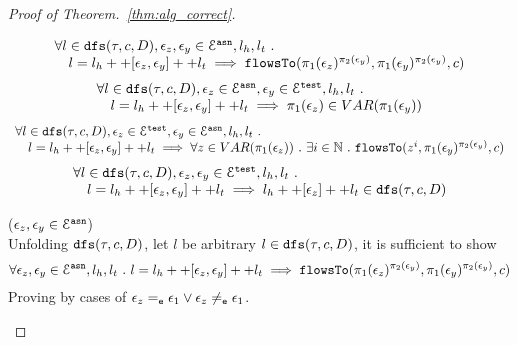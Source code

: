 \documentclass[a4paper,11pt]{article}
\begin{document}
\begin{proof}[Proof of Theorem.~\ref{thm:alg_correct}]
\begin{case}
\begin{equation}
\begin{array}{l}
   \forall l \in \mathtt{dfs}(\mathtt{\tau}, c, D), \mathtt{\epsilon}_z, \mathtt{\epsilon}_y \in \mathcal{E}^{\mathtt{{asn}}}, l_h, l_t ~.~ 
   \\ \quad 
   l = l_h ++ [\mathtt{\epsilon}_z, \mathtt{\epsilon}_y] ++ l_t 
   \implies \mathtt{flowsTo}(\pi_1(\mathtt{\epsilon}_z)^{\pi_2(\mathtt{\epsilon}_y)}, \pi_1(\mathtt{\epsilon}_y)^{\pi_2(\mathtt{\epsilon}_y)}, c)
\end{array}
\end{equation}
%
\begin{equation}
\begin{array}{l}
  \forall l \in \mathtt{dfs}(\mathtt{\tau}, c, D), \mathtt{\epsilon}_z \in \mathcal{E}^{\mathtt{{asn}}}, \mathtt{\epsilon}_y \in \mathcal{E}^{\mathtt{{test}}}, l_h, l_t ~.~
   \\ \quad 
   l = l_h ++ [\mathtt{\epsilon}_z, \mathtt{\epsilon}_y] ++ l_t 
  \implies \pi_1(\mathtt{\epsilon}_z) \in VAR(\pi_1(\mathtt{\epsilon}_y))
\end{array}
\end{equation}
%
\begin{equation}
\begin{array}{l}
  \forall l \in \mathtt{dfs}(\mathtt{\tau}, c, D), \mathtt{\epsilon}_z \in \mathcal{E}^{\mathtt{{test}}}, \mathtt{\epsilon}_y \in \mathcal{E}^{\mathtt{{asn}}}, l_h, l_t ~.~
   \\ \quad 
   l = l_h ++ [\mathtt{\epsilon}_z, \mathtt{\epsilon}_y] ++ l_t 
  \implies \forall z \in VAR(\pi_1(\mathtt{\epsilon}_z)) ~.~ \exists i \in\mathbb{N} ~.~
  \mathtt{flowsTo}(z^i, \pi_1(\mathtt{\epsilon}_y)^{\pi_2(\mathtt{\epsilon}_y)}, c)
\end{array}
\end{equation}
%
\begin{equation}
\begin{array}{l}
  \forall l \in \mathtt{dfs}(\mathtt{\tau}, c, D), \mathtt{\epsilon}_z, \mathtt{\epsilon}_y \in \mathcal{E}^{\mathtt{{test}}}, l_h, l_t ~.~
   \\ \quad 
   l = l_h ++ [\mathtt{\epsilon}_z, \mathtt{\epsilon}_y] ++ l_t 
  \implies l_h ++ [\mathtt{\epsilon}_z] ++ l_t \in \mathtt{dfs}(\mathtt{\tau}, c, D)
\end{array}
\end{equation}
%
\begin{subcase}($\mathtt{\epsilon}_z, \mathtt{\epsilon}_y \in \mathcal{E}^{\mathtt{{asn}}}$)
\\
Unfolding $\mathtt{dfs}(\mathtt{\tau}, c, D)$, let $l$ be arbitrary $l \in  \mathtt{dfs}(\mathtt{\tau}, c, D)$, it is sufficient to show 
\[
   \forall \mathtt{\epsilon}_z, \mathtt{\epsilon}_y \in \mathcal{E}^{\mathtt{{asn}}}, l_h, l_t ~.~ 
   l = l_h ++ [\mathtt{\epsilon}_z, \mathtt{\epsilon}_y] ++ l_t 
   \implies \mathtt{flowsTo}(\pi_1(\mathtt{\epsilon}_z)^{\pi_2(\mathtt{\epsilon}_y)}, \pi_1(\mathtt{\epsilon}_y)^{\pi_2(\mathtt{\epsilon}_y)}, c)
\] 
%
Proving by cases of $\mathtt{\epsilon}_z =_{\mathtt{e}} \mathtt{\epsilon}_1 \lor \mathtt{\epsilon}_z \neq_{\mathtt{e}} \mathtt{\epsilon}_1$.
\begin{subsubcase}

\end{subsubcase}
\end{subcase}
\end{case}
\end{proof}
\end{document}

